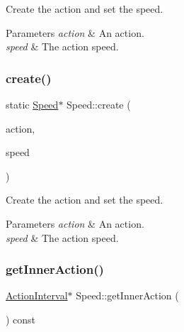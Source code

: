 Create the action and set the speed.


\begin{DoxyParams}{Parameters}
{\em action} & An action. \\
\hline
{\em speed} & The action speed. \\
\hline
\end{DoxyParams}
\mbox{\label{classSpeed_a0756d995012f1dab22bf8e03e0caf171}} 
\subsubsection{\texorpdfstring{create()}{create()}\hspace{0.1cm}{\footnotesize\ttfamily [2/2]}}
{\footnotesize\ttfamily static \hyperlink{classSpeed}{Speed}$\ast$ Speed\+::create (\begin{DoxyParamCaption}\item[{\hyperlink{classActionInterval}{Action\+Interval} $\ast$}]{action,  }\item[{float}]{speed }\end{DoxyParamCaption})\hspace{0.3cm}{\ttfamily [static]}}

Create the action and set the speed.


\begin{DoxyParams}{Parameters}
{\em action} & An action. \\
\hline
{\em speed} & The action speed. \\
\hline
\end{DoxyParams}
\mbox{\label{classSpeed_a1b48ca1bbd76431c0ebe2d59f0075331}} 
\subsubsection{\texorpdfstring{get\+Inner\+Action()}{getInnerAction()}\hspace{0.1cm}{\footnotesize\ttfamily [1/2]}}
{\footnotesize\ttfamily \hyperlink{classActionInterval}{Action\+Interval}$\ast$ Speed\+::get\+Inner\+Action (\begin{DoxyParamCaption}{ }\end{DoxyParamCaption}) const\hspace{0.3cm}{\ttfamily [inline]}}

